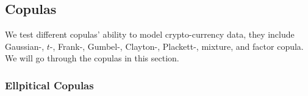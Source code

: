 
\subsection{Copulas}
We test different copulas' ability to model crypto-currency data,
they include Gaussian-, $t$-, Frank-, Gumbel-, Clayton-, Plackett-, mixture, and factor copula.
We will go through the copulas in this section.

%
%

\subsubsection{Ellpitical Copulas}\label{sec:ellpitical-copulas}
%
%
%
%

